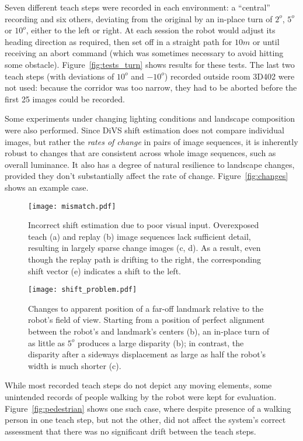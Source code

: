 \documentclass[twocolumn, 9pt,fleqn]{jsproceedings}
\begin{document}
Seven different teach steps were recorded in each environment: a ``central'' recording and six others, deviating from the original by an in-place turn of $2^o$, $5^o$ or $10^o$, either to the left or right. At each session the robot would adjust its heading direction as required, then set off in a straight path for $10m$ or until receiving an abort command (which was sometimes necessary to avoid hitting some obstacle). Figure~\ref{fig:tests_turn} shows results for these tests. The last two teach steps (with deviations of $10^o$ and $-10^o$) recorded outside room 3D402 were not used: because the corridor was too narrow, they had to be aborted before the first 25 images could be recorded.

Some experiments under changing lighting conditions and landscape composition were also performed. Since DiVS shift estimation does not compare individual images, but rather the {\it rates of change} in pairs of image sequences, it is inherently robust to changes that are consistent across whole image sequences, such as overall luminance. It also has a degree of natural resilience to landscape changes, provided they don't substantially affect the rate of change. Figure~\ref{fig:changes} shows an example case.

\begin{figure}[h!]
\texttt{[image: mismatch.pdf]}
\caption{Incorrect shift estimation due to poor visual input. Overexposed teach (a) and replay (b) image sequences lack sufficient detail, resulting in largely sparse change images (c, d). As a result, even though the replay path is drifting to the right, the corresponding shift vector (e) indicates a shift to the left.}
\label{fig:mismatch}
\end{figure}

\begin{figure}[h!]
\texttt{[image: shift\_problem.pdf]}
\caption{Changes to apparent position of a far-off landmark relative to the robot's field of view. Starting from a position of perfect alignment between the robot's and landmark's centers (b), an in-place turn of as little as $5^o$ produces a large disparity (b); in contrast, the disparity after a sideways displacement as large as half the robot's width is much shorter (c).}
\label{fig:shift_problem}
\end{figure}

While most recorded teach steps do not depict any moving elements, some unintended records of people walking by the robot were kept for evaluation. Figure~\ref{fig:pedestrian} shows one such case, where despite presence of a walking person in one teach step, but not the other, did not affect the system's correct assessment that there was no significant drift between the teach steps.
\end{document}
